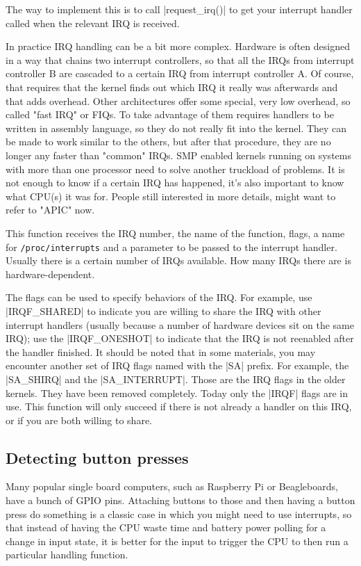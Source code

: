 \documentclass[10pt, oneside]{book}
\begin{document}
The way to implement this is to call \cpp|request_irq()| to get your interrupt handler called when the relevant IRQ is received.

In practice IRQ handling can be a bit more complex.
Hardware is often designed in a way that chains two interrupt controllers, so that all the IRQs from interrupt controller B are cascaded to a certain IRQ from interrupt controller A.
Of course, that requires that the kernel finds out which IRQ it really was afterwards and that adds overhead. Other architectures offer some special, very low overhead, so called "fast IRQ" or FIQs.
To take advantage of them requires handlers to be written in assembly language, so they do not really fit into the kernel.
They can be made to work similar to the others, but after that procedure, they are no longer any faster than "common" IRQs.
SMP enabled kernels running on systems with more than one processor need to solve another truckload of problems.
It is not enough to know if a certain IRQ has happened, it's also important to know what CPU(s) it was for.
People still interested in more details, might want to refer to "APIC" now.

This function receives the IRQ number, the name of the function, flags, a name for \verb|/proc/interrupts| and a parameter to be passed to the interrupt handler.
Usually there is a certain number of IRQs available.
How many IRQs there are is hardware-dependent.

The flags can be used to specify behaviors of the IRQ.
For example, use \cpp|IRQF_SHARED| to indicate you are willing to share the IRQ with other interrupt handlers (usually because a number of hardware devices sit on the same IRQ); use the \cpp|IRQF_ONESHOT| to indicate that the IRQ is not reenabled after the handler finished.
It should be noted that in some materials, you may encounter another set of IRQ flags named with the \cpp|SA| prefix.
For example, the \cpp|SA_SHIRQ| and the \cpp|SA_INTERRUPT|.
Those are the IRQ flags in the older kernels.
They have been removed completely.
Today only the \cpp|IRQF| flags are in use.
This function will only succeed if there is not already a handler on this IRQ, or if you are both willing to share.

\subsection{Detecting button presses}
\label{sec:detect_button}
Many popular single board computers, such as Raspberry Pi or Beagleboards, have a bunch of GPIO pins.
Attaching buttons to those and then having a button press do something is a classic case in which you might need to use interrupts,
so that instead of having the CPU waste time and battery power polling for a change in input state, it is better for the input to trigger the CPU to then run a particular handling function.
\end{document}
